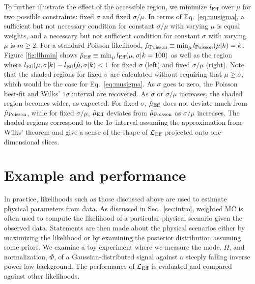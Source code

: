 \documentclass[a4paper, 11pt]{article}
\newcommand{\like}{\mathcal{L}}
\newcommand{\mcl}{\like_\textmd{Eff}}
\newcommand{\lpoisson}{l_{\textmd{Poisson}}}
\newcommand{\lmc}{l_\textmd{Eff}}
\newcommand{\hatmu}{\hat{\mu}}
\newcommand{\hatpoisson}{\hatmu_\textmd{Poisson}}
\newcommand{\hatmc}{\hatmu_\textmd{Eff}}
\begin{document}
To further illustrate the effect of the accessible region, we minimize $\lmc$ over $\mu$ for two possible constraints: fixed $\sigma$ and fixed $\sigma/\mu$. In terms of Eq.~\eqref{eq:musigma}, a sufficient but not necessary condition for constant $\sigma/\mu$ with varying $\mu$ is equal weights, and a necessary but not sufficient condition for constant $\sigma$ with varying $\mu$ is $m \geq 2$. For a standard Poisson likelihood, $\hatpoisson\equiv \min_\mu\lpoisson(\mu|k) = k$. Figure \ref{fig:llhmin} shows $\hatmc \equiv \min_\mu \lmc(\mu,\sigma|k=100)$ as well as the region where $\lmc(\mu, \sigma|k) - \lmc(\hatmu, \sigma|k) < 1$ for fixed $\sigma$ (left) and fixed $\sigma/\mu$ (right). Note that the shaded regions for fixed $\sigma$ are calculated without requiring that $\mu \geq \sigma$, which would be the case for Eq.~\eqref{eq:musigma}. As $\sigma$ goes to zero, the Poisson best-fit and Wilks' $1\sigma$ interval are recovered. As $\sigma$ or $\sigma/\mu$ increases, the shaded region becomes wider, as expected. For fixed $\sigma$, $\hatmc$ does not deviate much from $\hatpoisson$, while for fixed $\sigma/\mu$, $\hatmc$ deviates from $\hatpoisson$ as $\sigma/\mu$ increases. The shaded regions correspond to the $1\sigma$ interval assuming the approximation from Wilks' theorem and give a sense of the shape of $\mcl$ projected onto one-dimensional slices.

\section{Example and performance}\label{sec:example}

In practice, likelihoods such as those discussed above are used to estimate physical parameters from data. As discussed in Sec.~\ref{sec:intro}, weighted MC is often used to compute the likelihood of a particular physical scenario given the observed data. Statements are then made about the physical scenarios either by maximizing the likelihood or by examining the posterior distribution assuming some priors. We examine a toy experiment where we measure the mode, $\Omega$, and normalization, $\Phi$, of a Gaussian-distributed signal against a steeply falling inverse power-law background. The performance of $\mcl$ is evaluated and compared against other likelihoods.
\end{document}
